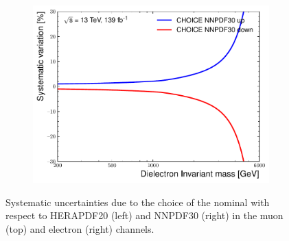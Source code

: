 \begin{figure}[h!]
\begin{subfigure}[b]{0.42\textwidth}
        \includegraphics[width=\textwidth]{figures/analysis/datamc/Uncertainties/theory/ee/backgroundTemplate_KF_CHOICE_NNPDF30.pdf}
        \label{fig:uncert:eechoiceNNPDF}
    \end{subfigure}
    \caption{Systematic uncertainties due to the choice of the nominal with respect to HERAPDF20 (left) and NNPDF30 (right) in the muon (top) and electron (right) channels.}
    \label{fig:uncert:pdfchoice}
\end{figure}

